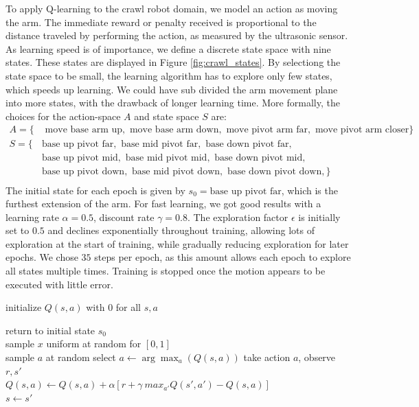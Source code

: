 \documentclass[11pt, a4paper]{article}
\begin{document}
	To apply Q-learning to the crawl robot domain, we model an action as moving the arm. The immediate reward or penalty received is proportional to the distance traveled by performing the action, as measured by the ultrasonic sensor. As learning speed is of importance, we define a discrete state space with nine states. These states are displayed in Figure \ref{fig:crawl_states}. By selectiong the state space to be small, the learning algorithm has to explore only few states, which speeds up learning. We could have sub divided the arm movement plane into more states, with the drawback of longer learning time. More formally, the choices for the action-space $A$ and state space $S$ are:
	\begin{align*}
	A = \{ &\text{ move base arm up}, \text{ move base arm down} , \text{ move pivot arm far}, \text{ move pivot arm closer}\} \\
	S = \{ &\text{base up pivot far}, \text{ base mid pivot far}, \text{ base down pivot far}, \\
	&\text{base up pivot mid}, \text{ base mid pivot mid}, \text{ base down pivot mid},\\
	&\text{base up pivot down}, \text{ base mid pivot down}, \text{ base down pivot down},\} \\
	\end{align*}
	The initial state for each epoch is given by $s_0 = \text{base up pivot far}$, which is the furthest extension of the arm. For fast learning, we got good results with a learning rate $\alpha = 0.5$, discount rate $\gamma = 0.8$. The exploration factor $\epsilon$ is initially set to $0.5$ and declines exponentially throughout training, allowing lots of exploration at the start of training, while gradually reducing exploration for later epochs. We chose $35$ steps per epoch, as this amount allows each epoch to explore all states multiple times. Training is stopped once the motion appears to be executed with little error.
	
	\begin{algorithm}[H]
		
		\Input{learning rate $\alpha \in ]0,1]$, discount rate $\gamma \in [0,1[$}
		initialize $Q(s, a)$ with $0$ for all $s,a$\\
		{
			return to initial state $s_0$ \\
			{
				sample $x$ uniform at random for $[0,1]$ \\
				{sample $a$ at random}
				{select $a \leftarrow \arg \max_a(Q(s,a))$}	
				take action $a$, observe $r, s'$ \\
				$Q(s,a) \leftarrow Q(s,a) + \alpha [r + \gamma \  max_{a'} Q(s', a') - Q(s,a)]$ \\
				$s \leftarrow s'$
			}
			
		}
		\caption{Q-learning with $\epsilon$-greedy exploration}
		\label{alg:q-learn}
	\end{algorithm}
	
\end{document}
